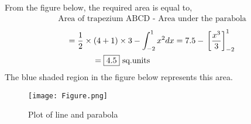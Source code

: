 \documentclass[journal,12pt,twocolumn]{IEEEtran}
\providecommand{\sbrak}[1]{\ensuremath{{}\left[#1\right]}}
\theoremstyle{remark}
\begin{document}
\begin{flushleft}
\vfill\null 
\columnbreak

From the figure below, the required area is equal to,
\begin{align}
    \text{Area of trapezium ABCD - Area under the parabola}
\end{align}
\begin{multline}
    = \frac{1}{2}\times (4 + 1)\times 3 - \int_{-2}^{1} x^2 dx = 7.5 - \sbrak{\frac{x^3}{3}}_{-2}^1 \\
    = \text{\fbox{4.5} sq.units \hspace{2.4cm}}
\end{multline}
The blue shaded region in the figure below represents this area.
\begin{figure}[ht]
    \centering
    \texttt{[image: Figure.png]}
    \caption{Plot of line and parabola}
    \label{Figure}
\end{figure}
\end{flushleft}
\end{document}
